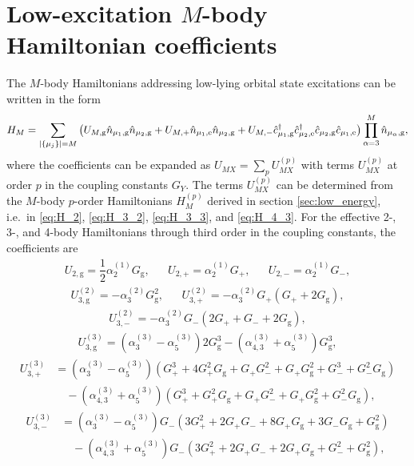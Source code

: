 \documentclass[preprint,showkeys,nofootinbib]{revtex4-1}
\newcommand{\f}{\dfrac} %
\newcommand{\p}[1]{\left(#1\right)} %
\renewcommand{\set}[1]{\left\{#1\right\}} %
\newcommand{\g}{\text{g}}
\newcommand{\e}{\text{e}}
\renewcommand{\c}{\hat{c}}
\newcommand{\n}{\hat{n}}
\newcommand{\1}{\mathds{1}}
\begin{document}
\section{Low-excitation $M$-body Hamiltonian coefficients}
\label{sec:U_X}

The $M$-body Hamiltonians addressing low-lying orbital state
excitations can be written in the form
\begin{align}
  H_M = \sum_{\abs{\set{\mu_j}}=M}
  \p{U_{M,\g} \n_{\mu_1,\g} \n_{\mu_2,\g}
    + U_{M,+} \n_{\mu_1,\e} \n_{\mu_2,\g}
    + U_{M,-} \c_{\mu_1,\g}^\dag \c_{\mu_2,\e}^\dag
    \c_{\mu_2,\g} \c_{\mu_1,\e}}
  \prod_{\alpha=3}^M \n_{\mu_\alpha,\g},
\end{align}
where the coefficients can be expanded as
$U_{MX} = \sum_p U_{MX}^{(p)}$ with terms $U_{MX}^{(p)}$ at order $p$
in the coupling constants $G_Y$.  The terms $U_{MX}^{(p)}$ can be
determined from the $M$-body $p$-order Hamiltonians $H_M^{(p)}$
derived in section \ref{sec:low_energy}, i.e.~in \eqref{eq:H_2},
\eqref{eq:H_3_2}, \eqref{eq:H_3_3}, and \eqref{eq:H_4_3}.  For the
effective 2-, 3-, and 4-body Hamiltonians through third order in the
coupling constants, the coefficients are
\begin{align}
  U_{2,\g} = \f12 \alpha_2^{(1)} G_\g,
  &&
  U_{2,+} = \alpha_2^{(1)} G_+,
  &&
  U_{2,-} = \alpha_2^{(1)} G_-,
\end{align}
\begin{align}
  U_{3,\g}^{(2)} = - \alpha_3^{(2)} G_\g^2,
  &&
  U_{3,+}^{(2)} = - \alpha_3^{(2)} G_+ \p{G_+ + 2 G_\g},
\end{align}
\begin{align}
  U_{3,-}^{(2)} = - \alpha_3^{(2)} G_- \p{2 G_+ + G_- + 2 G_\g},
\end{align}
\begin{align}
  U_{3,\g}^{(3)}
  = \p{\alpha_3^{(3)} - \alpha_5^{(3)}} 2 G_\g^3
  - \p{\alpha_{4,3}^{(3)} + \alpha_5^{(3)}} G_\g^3,
\end{align}
\begin{align}
  U_{3,+}^{(3)}
  &= \p{\alpha_3^{(3)} - \alpha_5^{(3)}} \p{G_+^3 + 4 G_+^2 G_\g
    + G_+ G_-^2 + G_+ G_\g^2 + G_-^3 + G_-^2 G_\g} \nonumber \\
  &\quad - \p{\alpha_{4,3}^{(3)} + \alpha_5^{(3)}}
  \p{G_+^3 + G_+^2 G_\g + G_+ G_-^2 + G_+ G_\g^2 + G_-^2 G_\g},
\end{align}
\begin{align}
  U_{3,-}^{(3)}
  &= \p{\alpha_3^{(3)} - \alpha_5^{(3)}} G_- \p{3 G_+^2
    + 2 G_+ G_- + 8 G_+ G_\g + 3 G_- G_\g + G_\g^2} \nonumber \\
  &\quad - \p{\alpha_{4,3}^{(3)} + \alpha_5^{(3)}}
  G_- \p{3 G_+^2 + 2 G_+ G_- + 2 G_+ G_\g + G_-^2 + G_\g^2},
\end{align}
\end{document}
